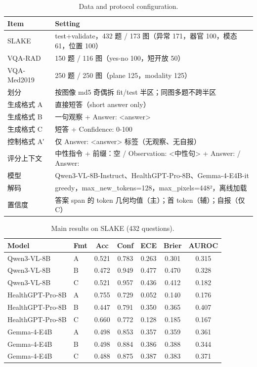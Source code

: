 \begin{table}[t]
\centering
\small
\caption{Data and protocol configuration.}
\label{tab:config}
\begin{tabular}{ll}
\toprule
Item & Setting \\
\midrule
SLAKE & test+validate，432 题 / 173 图（异常 171，器官 100，模态 61，位置 100） \\
VQA-RAD & 150 题 / 116 图（yes-no 100，短开放 50） \\
VQA-Med2019 & 250 题 / 250 图（plane 125，modality 125） \\
划分 & 按图像 md5 奇偶拆 fit/test 半区；同图多题不跨半区 \\
生成格式 A & 直接短答（short answer only） \\
生成格式 B & 一句观察 + Answer: <answer> \\
生成格式 C & 短答 + Confidence: 0-100 \\
控制格式 A′ & 仅 Answer: <answer> 标签（无观察、无自报） \\
评分上下文 & 中性指令 + 前缀：空 / Observation: <中性句> + Answer: / Answer: \\
模型 & Qwen3-VL-8B-Instruct、HealthGPT-Pro-8B、Gemma-4-E4B-it \\
解码 & greedy，max_new_tokens=128，max_pixels=448²，离线加载 \\
置信度 & 答案 span 的 token 几何均值（主）；首 token（辅）；自报（仅 C） \\
\bottomrule
\end{tabular}
\end{table}

\begin{table}[t]
\centering
\small
\caption{Main results on SLAKE (432 questions).}
\label{tab:main}
\begin{tabular}{llccccc}
\toprule
Model & Fmt & Acc & Conf & ECE & Brier & AUROC \\
\midrule
Qwen3-VL-8B & A & 0.521 & 0.783 & 0.263 & 0.301 & 0.315 \\
Qwen3-VL-8B & B & 0.472 & 0.949 & 0.477 & 0.470 & 0.328 \\
Qwen3-VL-8B & C & 0.521 & 0.957 & 0.436 & 0.412 & 0.182 \\
HealthGPT-Pro-8B & A & 0.755 & 0.729 & 0.052 & 0.140 & 0.176 \\
HealthGPT-Pro-8B & B & 0.447 & 0.791 & 0.350 & 0.365 & 0.407 \\
HealthGPT-Pro-8B & C & 0.660 & 0.772 & 0.128 & 0.185 & 0.167 \\
Gemma-4-E4B & A & 0.498 & 0.853 & 0.357 & 0.359 & 0.361 \\
Gemma-4-E4B & B & 0.498 & 0.884 & 0.386 & 0.388 & 0.344 \\
Gemma-4-E4B & C & 0.488 & 0.875 & 0.387 & 0.383 & 0.371 \\
\bottomrule
\end{tabular}
\end{table}

